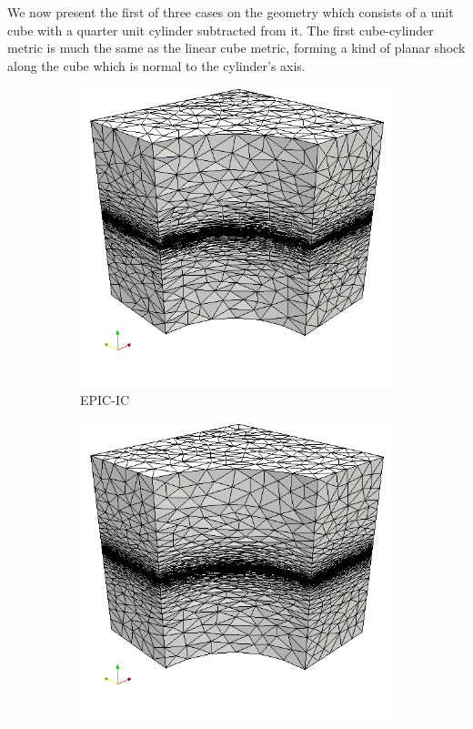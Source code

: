 \documentclass[3p,times,procedia,number]{elsarticle}
\begin{document}
We now present the first of three cases on the geometry
which consists of a unit cube with a quarter unit cylinder
subtracted from it.
The first cube-cylinder metric is much the same as the
linear cube metric, forming a kind of planar shock along
the cube which is normal to the cylinder's axis.

\begin{figure}
\begin{subfigure}{.24\textwidth}
\centering
\includegraphics[width=\textwidth]{epic-ic-cube-cylinder-linear.png}
\caption{EPIC-IC}
\end{subfigure}
\begin{subfigure}{.24\textwidth}
\centering
\includegraphics[width=\textwidth]{epic-ics-cube-cylinder-linear.png}

\end{subfigure}
\end{figure}
\end{document}
